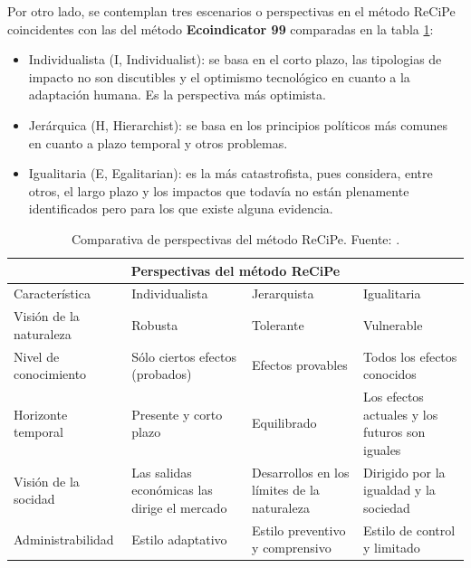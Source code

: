 Por otro lado, se contemplan tres escenarios o perspectivas en el método ReCiPe coincidentes con las del método \textbf{Ecoindicator 99} comparadas en la tabla \ref{perspectivas_recipe}:

\begin{itemize}
  \item Individualista (I, Individualist): se basa en el corto plazo, las tipologias de impacto no son discutibles y el optimismo tecnológico en cuanto a la adaptación humana. Es la perspectiva más optimista.
  \item Jerárquica (H, Hierarchist): se basa en los principios políticos más comunes en cuanto a plazo temporal y otros problemas.
  \item Igualitaria (E, Egalitarian): es la más catastrofista, pues considera, entre otros, el largo plazo y los impactos que todavía no están plenamente identificados pero para los que existe alguna evidencia.
\end{itemize}

\begin{table}[!htb]
\centering
\begin{footnotesize}
\begin{tabular}{p{3.5cm}p{3cm}p{3cm}p{3cm}}
\toprule
\multicolumn{4}{c}{Perspectivas del método ReCiPe}\\
\midrule
Característica & Individualista & Jerarquista & Igualitaria\\
\midrule
Visión de la naturaleza & Robusta & Tolerante & Vulnerable\\
Nivel de conocimiento & Sólo ciertos efectos (probados) & Efectos provables & Todos los efectos conocidos\\
Horizonte temporal & Presente y corto plazo & Equilibrado & Los efectos actuales y los futuros son iguales\\
Visión de la socidad & Las salidas económicas las dirige el mercado & Desarrollos en los límites de la naturaleza & Dirigido por la igualdad y la sociedad\\
Administrabilidad & Estilo adaptativo & Estilo preventivo y comprensivo & Estilo de control y limitado\\
\bottomrule
\end{tabular}
\end{footnotesize}
\caption[Comparativa de perspectivas del método ReCiPe.]{Comparativa de perspectivas del método ReCiPe. Fuente: \cite{schryver}.}
\label{perspectivas_recipe}
\end{table}

